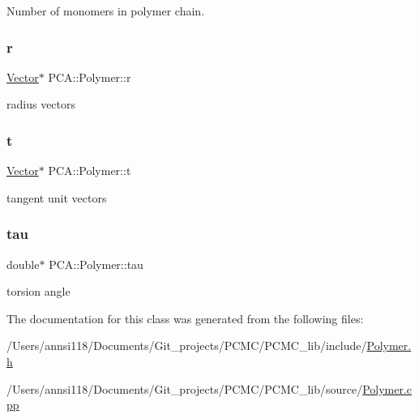 Number of monomers in polymer chain. 

\hypertarget{class_p_c_a_1_1_polymer_a9822e3b9c3420a04a689706b84e586ca}{}\label{class_p_c_a_1_1_polymer_a9822e3b9c3420a04a689706b84e586ca} 
\subsubsection{\texorpdfstring{r}{r}}
{\footnotesize\ttfamily \hyperlink{class_p_c_a_1_1_vector}{Vector}$\ast$ P\+C\+A\+::\+Polymer\+::r\hspace{0.3cm}{\ttfamily [protected]}}



radius vectors 

\hypertarget{class_p_c_a_1_1_polymer_a0fd79e19a8c09a9e4c72903924151b5e}{}\label{class_p_c_a_1_1_polymer_a0fd79e19a8c09a9e4c72903924151b5e} 
\subsubsection{\texorpdfstring{t}{t}}
{\footnotesize\ttfamily \hyperlink{class_p_c_a_1_1_vector}{Vector}$\ast$ P\+C\+A\+::\+Polymer\+::t\hspace{0.3cm}{\ttfamily [protected]}}



tangent unit vectors 

\hypertarget{class_p_c_a_1_1_polymer_ab3b07298bdbac01a7b20b2554d7b248f}{}\label{class_p_c_a_1_1_polymer_ab3b07298bdbac01a7b20b2554d7b248f} 
\subsubsection{\texorpdfstring{tau}{tau}}
{\footnotesize\ttfamily double$\ast$ P\+C\+A\+::\+Polymer\+::tau\hspace{0.3cm}{\ttfamily [protected]}}



torsion angle 



The documentation for this class was generated from the following files\+:\begin{DoxyCompactItemize}
\item 
/\+Users/annsi118/\+Documents/\+Git\+\_\+projects/\+P\+C\+M\+C/\+P\+C\+M\+C\+\_\+lib/include/\hyperlink{_polymer_8h}{Polymer.\+h}\item 
/\+Users/annsi118/\+Documents/\+Git\+\_\+projects/\+P\+C\+M\+C/\+P\+C\+M\+C\+\_\+lib/source/\hyperlink{_polymer_8cpp}{Polymer.\+cpp}\end{DoxyCompactItemize}

